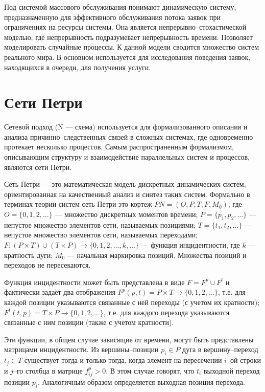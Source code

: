 Под системой массового обслуживания понимают динамическую систему, предназначенную для эффективного обслуживания потока заявок  при ограничениях на ресурсы системы. Она является непрерывно--стохастической моделью, где непрерывность подразумевает непрерывность времени. Позволяет моделировать случайные процессы. К данной модели сводится множество систем реального мира. В основном используется для исследования поведения заявок, находящихся в очереди, для получения услуги.

\section{Сети Петри}
Сетевой подход (N --- схема) используется для формализованного описания и анализа причинно--следственных связей в сложных системах, где одновременно протекает несколько процессов. Самым распространенным формализмом, описывающим структуру и взаимодействие параллельных систем и процессов, являются сети Петри.

Сеть Петри --- это математическая модель дискретных динамических систем, ориентированная на качественный анализ и синтез таких систем. Формально в терминах теории систем сеть Петри это кортеж $PN = (O,P,T,F,M_0)$, где $O=\{0,1,2,\ldots\}$ --- множество дискретных моментов времени; $P=\{p_1,p_2,\ldots\}$ --- непустое множество элементов сети, называемых позициями; $T=\{t_1,t_2,\ldots\}$ --- непустое множество элементов сети, называемых переходами; $F:(P \times T) \cup(T \times P) \rightarrow\{0,1,2, \ldots, k, \ldots\}$ --- функция инцидентности, где $k$ --- кратность дуги; $M_0$ --- начальная маркировка позиций. Множества позиций и переходов не пересекаются.

Функция инцидентности может быть представлена в виде $F = F^p \cup F^t$ и фактически задаёт два отображения $F^p(p,t) = P \times T \rightarrow\{0,1,2, \ldots\}$, т.е. для каждой позиции указываются связанные с ней переходы (с учетом их кратности); $F^t(t, p) = T \times P \rightarrow\{0,1,2, \ldots\}$, т.е. для каждого перехода указываются связанные с ним позиции (также с учетом кратности). 

Эти функции, в общем случае зависящие от времени, могут быть представлены матрицами инцидентности. Из вершины--позиции $p_i \in P$ дуга в вершину--переход $t_j \in T$ существует тогда и только тогда, когда элемент на пересечении $i$--ой строки и $j$--го столбца в матрице $f_{ij}^p > 0$. В этом случае говорят, что $t_i$ выходной переход позиции $p_i$. Аналогичным образом определяется выходная позиция перехода.

